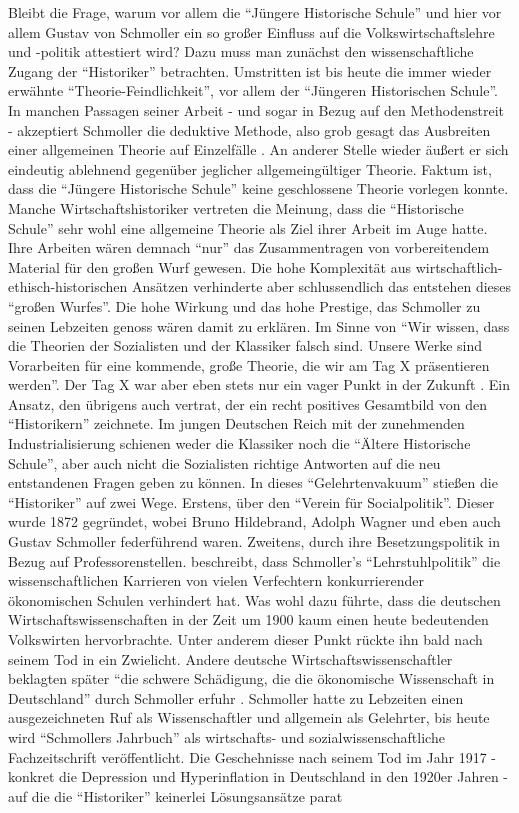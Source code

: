 Bleibt die Frage, warum vor allem die "`Jüngere Historische Schule"' und hier vor allem Gustav von Schmoller ein so großer Einfluss auf die Volkswirtschaftslehre und -politik attestiert wird? Dazu muss man zunächst den wissenschaftliche Zugang der "`Historiker"' betrachten. Umstritten ist bis heute die immer wieder erwähnte "`Theorie-Feindlichkeit"', vor allem der "`Jüngeren Historischen Schule"'. In manchen Passagen seiner Arbeit - und sogar in Bezug auf den Methodenstreit - akzeptiert Schmoller die deduktive Methode, also grob gesagt das Ausbreiten einer allgemeinen Theorie auf Einzelfälle \parencite[S. 108]{Winkel1989}. An anderer Stelle wieder äußert er sich eindeutig ablehnend gegenüber jeglicher allgemeingültiger Theorie. Faktum ist, dass die "`Jüngere Historische Schule"' keine geschlossene Theorie vorlegen konnte. Manche Wirtschaftshistoriker vertreten die Meinung, dass die "`Historische Schule"' sehr wohl eine allgemeine Theorie als Ziel ihrer Arbeit im Auge hatte. Ihre Arbeiten wären demnach "`nur"' das Zusammentragen von vorbereitendem Material für den großen Wurf gewesen. Die hohe Komplexität aus wirtschaftlich-ethisch-historischen Ansätzen verhinderte aber schlussendlich das entstehen dieses "`großen Wurfes"'. Die hohe Wirkung und das hohe Prestige, das Schmoller zu seinen Lebzeiten genoss wären damit zu erklären. Im Sinne von "`Wir wissen, dass die Theorien der Sozialisten und der Klassiker falsch sind. Unsere Werke sind Vorarbeiten für eine kommende, große Theorie, die wir am Tag X präsentieren werden"'. Der Tag X war aber eben stets nur ein vager Punkt in der Zukunft \parencite[S. 115]{Winkel1989}. Ein Ansatz, den übrigens auch \textcite[S. 775]{Schumpeter1954} vertrat, der ein recht positives Gesamtbild von den "`Historikern"' zeichnete. Im jungen Deutschen Reich mit der zunehmenden Industrialisierung schienen weder die Klassiker noch die "`Ältere Historische Schule"', aber auch nicht die Sozialisten richtige Antworten auf die neu entstandenen Fragen geben zu können. In dieses "`Gelehrtenvakuum"' stießen die "`Historiker"' auf zwei Wege. Erstens, über den "`Verein für Socialpolitik"'. Dieser wurde 1872 gegründet, wobei Bruno Hildebrand, Adolph Wagner und eben auch Gustav Schmoller federführend waren. Zweitens, durch ihre Besetzungspolitik in Bezug auf Professorenstellen. \textcite[S. 112]{Winkel1989} beschreibt, dass Schmoller's "`Lehrstuhlpolitik"' die wissenschaftlichen Karrieren von vielen Verfechtern konkurrierender ökonomischen Schulen verhindert hat. Was wohl dazu führte, dass die deutschen Wirtschaftswissenschaften in der Zeit um 1900 kaum einen heute bedeutenden Volkswirten hervorbrachte. Unter anderem dieser Punkt rückte ihn bald nach seinem Tod in ein Zwielicht. Andere deutsche Wirtschaftswissenschaftler beklagten später "`die schwere Schädigung, die die ökonomische Wissenschaft in Deutschland"' durch Schmoller erfuhr \parencite[S. 116]{Winkel1989}. Schmoller hatte zu Lebzeiten einen ausgezeichneten Ruf als Wissenschaftler und allgemein als Gelehrter, bis heute wird "`Schmollers Jahrbuch"' als wirtschafts- und sozialwissenschaftliche Fachzeitschrift veröffentlicht. Die Geschehnisse nach seinem Tod im Jahr 1917 - konkret die Depression und Hyperinflation in Deutschland in den 1920er Jahren - auf die die "`Historiker"' keinerlei Lösungsansätze parat 